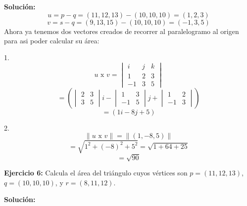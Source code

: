 \documentclass{article}
\begin{document}
\textbf{Solución:}
\vspace{10pt}
$$u = p - q = (11,12,13)-(10,10,10) = (1,2,3)$$
$$v = s-q =(9,13,15)- (10,10,10)= (-1,3,5)$$
Ahora ya tenemos dos vectores creados de recorrer al paralelogramo al origen para asi poder calcular su área:
\vspace{10pt}

\begin{minipage}[c]{0.5cm}
    1.
    $$u \text{ x } v =\begin{vmatrix}
        i & j & k \\
        1 & 2 & 3 \\
        -1 & 3 & 5 
    \end{vmatrix}$$
    $$= \left(\begin{vmatrix}
        2 & 3 \\
        3 & 5
    \end{vmatrix}i - \begin{vmatrix}
        1 & 3 \\
        -1 & 5
    \end{vmatrix}j + \begin{vmatrix}
        1 & 2 \\ 
        -1 & 3
    \end{vmatrix}\right)$$
    $$ =(1i-8j+5)$$
\end{minipage}\hspace*{6cm}\begin{minipage}[c]{0.5cm}
    2. 
    $$\|u \text{ x } v\| = \|(1, -8, 5)\|$$
    $$= \sqrt{1^2+(-8)^2+5^2} = \sqrt{1 + 64 + 25}$$
    $$= \sqrt{90}$$
\end{minipage}
\vspace{10pt}

\textbf{Ejercicio 6:} Calcula el área del triángulo cuyos vértices son $p = (11,12,13)$, $q=(10,10,10)$, y $r=(8,11,12)$.
\vspace{10pt}

\textbf{Solución:}
\vspace{10pt}
\end{document}
